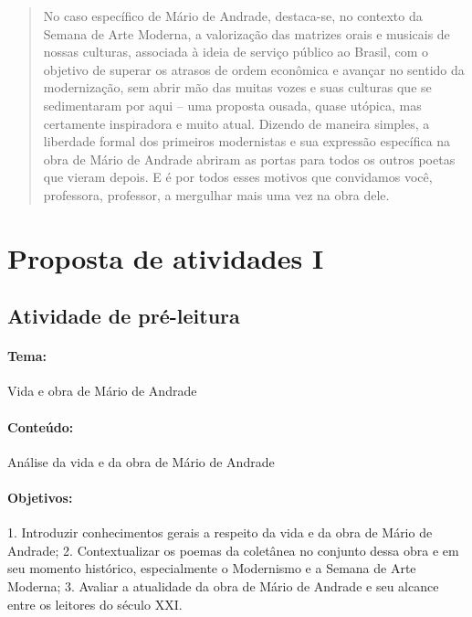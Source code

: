 \documentclass[11pt]{extarticle}
\begin{document}
\begin{abstract}
No caso específico de Mário de Andrade, destaca-se, no contexto da
Semana de Arte Moderna, a valorização das matrizes orais e musicais de
nossas culturas, associada à ideia de serviço público ao Brasil, com o
objetivo de superar os atrasos de ordem econômica e avançar no sentido
da modernização, sem abrir mão das muitas vozes e suas culturas que se
sedimentaram por aqui -- uma proposta ousada, quase utópica, mas
certamente inspiradora e muito atual. Dizendo de maneira simples, a
liberdade formal dos primeiros modernistas e sua expressão específica na
obra de Mário de Andrade abriram as portas para todos os outros poetas
que vieram depois. E é por todos esses motivos que convidamos você,
professora, professor, a mergulhar mais uma vez na obra dele.
\end{abstract}

\tableofcontents



\section{Proposta de atividades I}

\subsection{Atividade de pré-leitura}





\paragraph{Tema:} Vida e obra de Mário de Andrade


\paragraph{Conteúdo:} Análise da vida e da obra de Mário de Andrade

\paragraph{Objetivos:} 1. Introduzir conhecimentos gerais a respeito da
vida e da obra de Mário de Andrade; 2. Contextualizar os poemas da
coletânea no conjunto dessa obra e em seu momento histórico,
especialmente o Modernismo e a Semana de Arte Moderna; 3. Avaliar a
atualidade da obra de Mário de Andrade e seu alcance entre os leitores
do século XXI.
\end{document}

